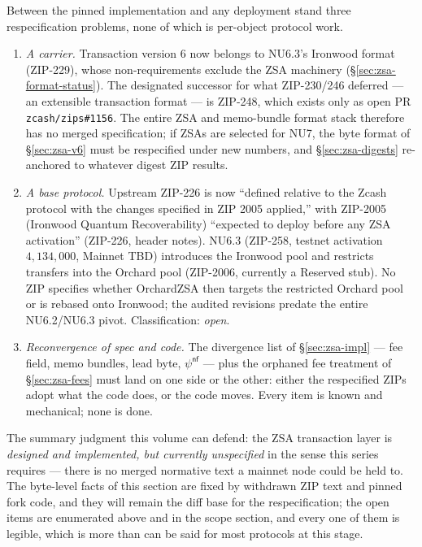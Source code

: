 \documentclass[11pt,a4paper]{article}
\theoremstyle{definition}
\begin{document}
Between the pinned implementation and any deployment stand three
respecification problems, none of which is per-object protocol work.
\begin{enumerate}[itemsep=2pt]
\item \emph{A carrier.} Transaction version 6 now belongs to NU6.3's
  Ironwood format (ZIP-229), whose non-requirements exclude the ZSA
  machinery (\S\ref{sec:zsa-format-status}). The designated successor for
  what ZIP-230/246 deferred --- an extensible transaction format --- is
  ZIP-248, which exists only as open PR \texttt{zcash/zips\#1156}. The
  entire ZSA and memo-bundle format stack therefore has no merged
  specification; if ZSAs are selected for NU7, the byte format of
  \S\ref{sec:zsa-v6} must be respecified under new numbers, and
  \S\ref{sec:zsa-digests} re-anchored to whatever digest ZIP results.
\item \emph{A base protocol.} Upstream ZIP-226 is now ``defined relative to
  the Zcash protocol with the changes specified in ZIP 2005 applied,'' with
  ZIP-2005 (Ironwood Quantum Recoverability) ``expected to deploy before any
  ZSA activation'' (ZIP-226, header notes). NU6.3 (ZIP-258, testnet
  activation $4{,}134{,}000$, Mainnet TBD) introduces the Ironwood pool and
  restricts transfers into the Orchard pool (ZIP-2006, currently a Reserved
  stub). No ZIP specifies whether OrchardZSA then targets the restricted
  Orchard pool or is rebased onto Ironwood; the audited revisions
  predate the entire NU6.2/NU6.3 pivot. Classification: \emph{open}.
\item \emph{Reconvergence of spec and code.} The divergence list of
  \S\ref{sec:zsa-impl} --- fee field, memo bundles, lead byte,
  $\psi^{\mathsf{nf}}$ --- plus the orphaned fee treatment of
  \S\ref{sec:zsa-fees} must land on one side or the other: either the
  respecified ZIPs adopt what the code does, or the code moves. Every item
  is known and mechanical; none is done.
\end{enumerate}

The summary judgment this volume can defend: the ZSA transaction layer is
\emph{designed and implemented, but currently unspecified} in
the sense this series requires --- there is no merged normative text a
mainnet node could be held to. The byte-level facts of this section are
fixed by withdrawn ZIP text and pinned fork code, and they will remain the
diff base for the respecification; the open items are enumerated above and
in the scope section, and every one of them is legible, which is more than
can be said for most protocols at this stage.
\end{document}
